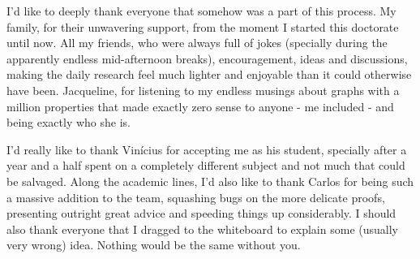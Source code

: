I'd like to deeply thank everyone that somehow was a part of this process.
My family, for their unwavering support, from the moment I started this doctorate until now.
All my friends, who were always full of jokes (specially during the apparently endless mid-afternoon breaks), encouragement, ideas and discussions, making the daily research feel much lighter and enjoyable than it could otherwise have been.
Jacqueline, for listening to my endless musings about graphs with a million properties that made exactly zero sense to anyone - me included - and being exactly who she is.

I'd really like to thank Vinícius for accepting me as his student, specially after a year and a half spent on a completely different subject and not much that could be salvaged.
Along the academic lines, I'd also like to thank Carlos for being such a massive addition to the team, squashing bugs on the more delicate proofs, presenting outright great advice and speeding things up considerably.
I should also thank everyone that I dragged to the whiteboard to explain some (usually very wrong) idea.
Nothing would be the same without you.
